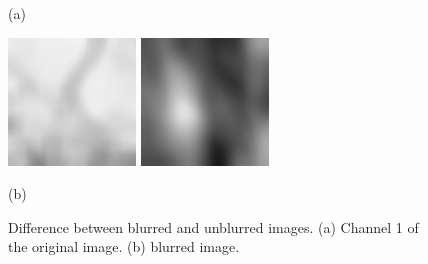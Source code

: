 \documentclass{article}
\begin{document}
\begin{figure}[ht]
\begin{minipage}{0.25\hsize}
                    \caption*{(a)}
                \end{minipage}
                \begin{minipage}{0.25\hsize}
                    \centering
                    \includegraphics[width = 1\hsize]{lead_patch_blurred.png}
                    \includegraphics[width = 1\hsize]{cloud_patch_blurred.png}
                    \caption*{(b)}
                \end{minipage}
                \caption{
                    Difference between blurred and unblurred images.
                    (a) Channel 1 of the original image.
                    (b) blurred image.
                }
                \label{fig:unsupervised_basis}
            \end{figure}
\end{document}
